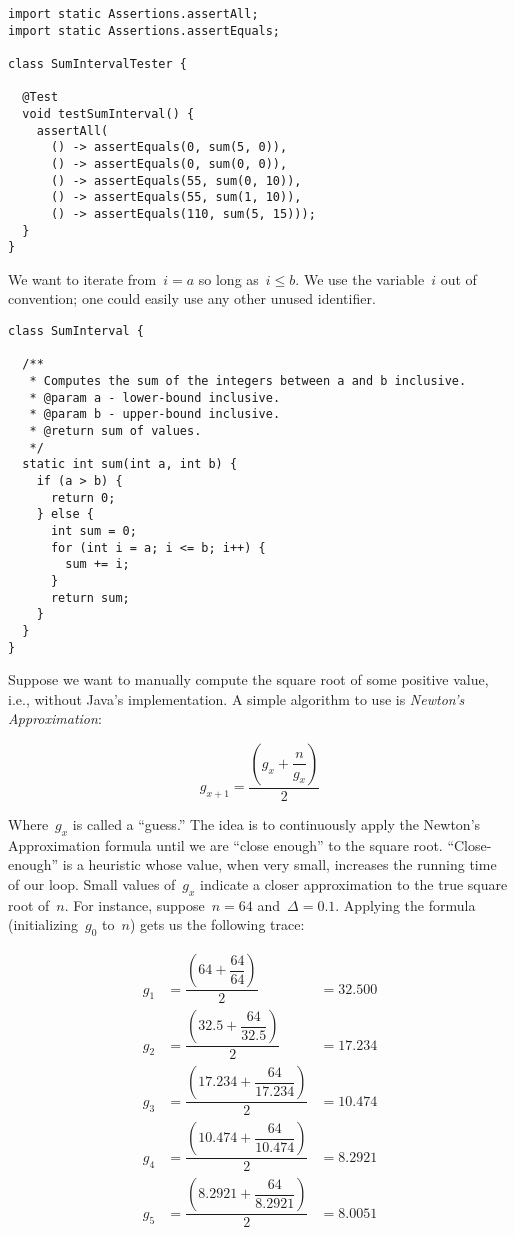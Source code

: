 \begin{lstlisting}[language=MyJava]
import static Assertions.assertAll;
import static Assertions.assertEquals;

class SumIntervalTester {

  @Test
  void testSumInterval() {
    assertAll(
      () -> assertEquals(0, sum(5, 0)),
      () -> assertEquals(0, sum(0, 0)),
      () -> assertEquals(55, sum(0, 10)),
      () -> assertEquals(55, sum(1, 10)),
      () -> assertEquals(110, sum(5, 15)));
  }
}
\end{lstlisting}

We want to iterate from~$i = a$ so long as~$i \leq b$. 
We use the variable~$i$ out of convention; one could easily use any other unused identifier.

\begin{lstlisting}[language=MyJava]
class SumInterval {

  /**
   * Computes the sum of the integers between a and b inclusive.
   * @param a - lower-bound inclusive.
   * @param b - upper-bound inclusive.
   * @return sum of values.
   */
  static int sum(int a, int b) {
    if (a > b) { 
      return 0; 
    } else {
      int sum = 0;
      for (int i = a; i <= b; i++) { 
        sum += i; 
      }
      return sum;
    }
  }
}
\end{lstlisting}

Suppose we want to manually compute the square root of some positive value, i.e., without Java's implementation. 
A simple algorithm to use is \emph{Newton's Approximation}:

\[
    g_{x+1} = \dfrac{\left(g_x + \dfrac{n}{g_x}\right)}{2}
\]

Where~$g_x$ is called a ``guess.'' 
The idea is to continuously apply the Newton's Approximation formula until we are ``close enough'' to the square root. 
``Close-enough'' is a heuristic whose value, when very small, increases the running time of our loop. 
Small values of~$g_x$ indicate a closer approximation to the true square root of~$n$. 
For instance, suppose~$n=64$ and~$\Delta=0.1$. 
Applying the formula (initializing~$g_0$ to~$n$) gets us the following trace:

\begin{align*}
g_1 &= \dfrac{\left(64 + \dfrac{64}{64}\right)}{2} &= 32.500\\
g_2 &= \dfrac{\left(32.5 + \dfrac{64}{32.5}\right)}{2} &= 17.234\\
g_3 &= \dfrac{\left(17.234 + \dfrac{64}{17.234}\right)}{2} &= 10.474\\
g_4 &= \dfrac{\left(10.474 + \dfrac{64}{10.474}\right)}{2} &= 8.2921\\
g_5 &= \dfrac{\left(8.2921 + \dfrac{64}{8.2921}\right)}{2} &= 8.0051\\
\end{align*}

